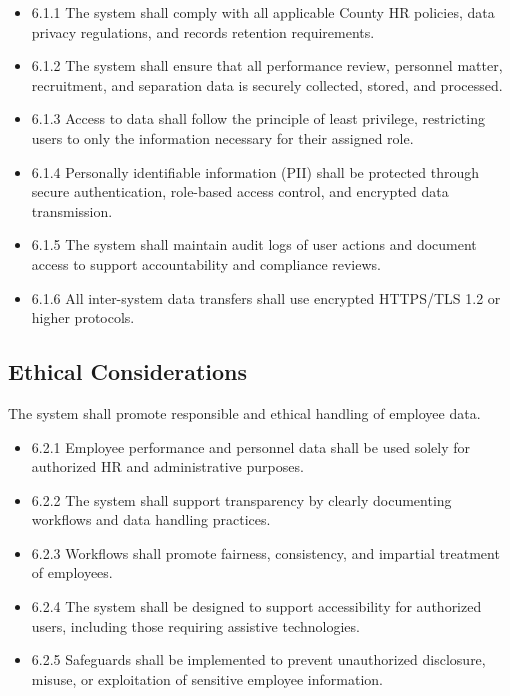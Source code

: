 \documentclass[12pt]{article}
\begin{document}
\begin{itemize}
    \item 6.1.1 The system shall comply with all applicable County HR policies, data privacy regulations, and records retention requirements.
    
    \item 6.1.2 The system shall ensure that all performance review, personnel matter, recruitment, and separation data is securely collected, stored, and processed.
    
    \item 6.1.3 Access to data shall follow the principle of least privilege, restricting users to only the information necessary for their assigned role.
    
    \item 6.1.4 Personally identifiable information (PII) shall be protected through secure authentication, role-based access control, and encrypted data transmission.
    
    \item 6.1.5 The system shall maintain audit logs of user actions and document access to support accountability and compliance reviews.
    
    \item 6.1.6 All inter-system data transfers shall use encrypted HTTPS/TLS 1.2 or higher protocols.
\end{itemize}


\subsection{Ethical Considerations}

The system shall promote responsible and ethical handling of employee data.

\begin{itemize}
    \item 6.2.1 Employee performance and personnel data shall be used solely for authorized HR and administrative purposes.
    
    \item 6.2.2 The system shall support transparency by clearly documenting workflows and data handling practices.
    
    \item 6.2.3 Workflows shall promote fairness, consistency, and impartial treatment of employees.
    
    \item 6.2.4 The system shall be designed to support accessibility for authorized users, including those requiring assistive technologies.
    
    \item 6.2.5 Safeguards shall be implemented to prevent unauthorized disclosure, misuse, or exploitation of sensitive employee information.
\end{itemize}
\end{document}
